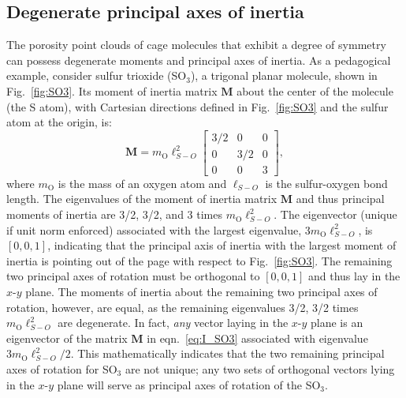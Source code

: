 \documentclass[journal=jacsat,manuscript=article]{achemso}
\begin{document}
{\subsection{Degenerate principal axes of inertia}
\label{sec:degenerate}
The porosity point clouds of cage molecules that exhibit a degree of symmetry can possess degenerate moments and principal axes of inertia. As a pedagogical example, consider sulfur trioxide (SO$_3$), a trigonal planar molecule, shown in Fig.~\ref{fig:SO3}. Its moment of inertia matrix $\mathbf{M}$ about the center of the molecule (the S atom), with Cartesian directions defined in Fig.~\ref{fig:SO3} and the sulfur atom at the origin, is:
\begin{equation}
\mathbf{M} = m_{\text{O}} \ell_{S-O}^2
  \begin{bmatrix}
    3/2 & 0 & 0 \\
    0 & 3/2 & 0 \\
    0 & 0 & 3
  \end{bmatrix}, \label{eq:I_SO3}
\end{equation} where $m_{\text{O}}$ is the mass of an oxygen atom and $\ell_{S-O}$ is the sulfur-oxygen bond length. The eigenvalues of the moment of inertia matrix $\mathbf{M}$ and thus principal moments of inertia are 3/2, 3/2, and 3 times $m_{\text{O}} \ell_{S-O}^2$. The eigenvector (unique if unit norm enforced) associated with the largest eigenvalue, $3 m_{\text{O}} \ell_{S-O}^2$, is $[0, 0, 1]$, indicating that the principal axis of inertia with the largest moment of inertia is pointing out of the page with respect to Fig.~\ref{fig:SO3}. The remaining two principal axes of rotation must be orthogonal to $[0, 0, 1]$ and thus lay in the $x$-$y$ plane. The moments of inertia about the remaining two principal axes of rotation, however, are equal, as the remaining eigenvalues 3/2, 3/2 times $m_{\text{O}} \ell_{S-O}^2$ are degenerate. In fact, \emph{any} vector laying in the $x$-$y$ plane is an eigenvector of the matrix $\mathbf{M}$ in eqn.~\ref{eq:I_SO3} associated with eigenvalue $3m_{\text{O}} \ell_{S-O}^2/2$. This mathematically indicates that the two remaining principal axes of rotation for SO$_3$ are not unique; any two sets of orthogonal vectors lying in the $x$-$y$ plane will serve as principal axes of rotation of the SO$_3$.

}
\end{document}
